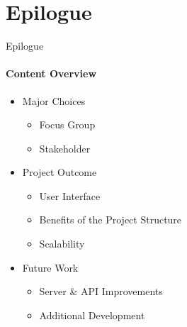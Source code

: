 \author{Marc4Prez}
\section{Epilogue}
    \begin{frame}{Epilogue}\framesubtitle{Content Overview}
        \begin{itemize}
            \item<1-> Major Choices
            \begin{itemize}
                    \item<1-> Focus Group
                    \item<1-> Stakeholder 
            \end{itemize}
            \item<2-> Project Outcome
                \begin{itemize}
                    \item<2-> User Interface
                    \item<2-> Benefits of the Project Structure 
                    \item<2-> Scalability
                \end{itemize}
            \item<3-> Future Work
            \begin{itemize}
                \item<3-> Server \& API Improvements
                \item<3-> Additional Development
            \end{itemize}
        \end{itemize}
    \end{frame}

